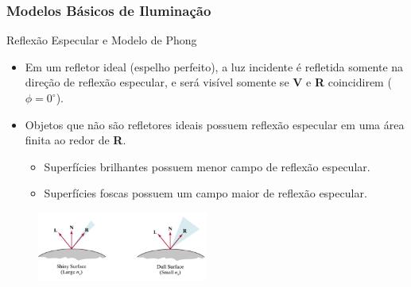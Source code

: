 \documentclass{beamer}
\begin{document}
\begin{frame}
\frametitle{Modelos Básicos de Iluminação}

	\begin{block}{Reflexão Especular e Modelo de Phong}
		\begin{itemize}
			\item Em um refletor ideal (espelho perfeito), a luz incidente é refletida somente na direção de reflexão especular, e será visível somente se 	\textbf{V} e \textbf{R} coincidirem ($\phi = 0^\circ$).
			\item Objetos que não são refletores ideais possuem reflexão especular em uma área finita ao redor de \textbf{R}.
			\begin{itemize}
				\item Superfícies brilhantes possuem menor campo de reflexão especular.
				\item Superfícies foscas possuem um campo maior de reflexão especular.
			\end{itemize}
		\end{itemize}
	\end{block}
	
	\begin{figure}[!h]
		\begin{center}
		\includegraphics[width=0.5\textwidth]{Figures/RefEspSup}
		\end{center}
	\end{figure}	
\end{frame}
\end{document}
